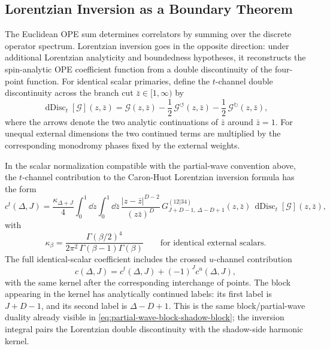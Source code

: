 \subsection{Lorentzian Inversion as a Boundary Theorem}

The Euclidean OPE sum determines correlators by summing over the discrete
operator spectrum.  Lorentzian inversion goes in the opposite direction: under
additional Lorentzian analyticity and boundedness hypotheses, it reconstructs
the spin-analytic OPE coefficient function from a double discontinuity of the
four-point function.  For identical scalar primaries, define the \(t\)-channel
double discontinuity across the branch cut \(\bar z\in[1,\infty)\) by
\begin{equation}
  \operatorname{dDisc}_t[\mathcal G](z,\bar z)
  =
  \mathcal G(z,\bar z)
  -
  \frac12\,\mathcal G^{\circlearrowleft}(z,\bar z)
  -
  \frac12\,\mathcal G^{\circlearrowright}(z,\bar z),
  \label{eq:lorentzian-ddisc-identical}
\end{equation}
where the arrows denote the two analytic continuations of \(\bar z\) around
\(\bar z=1\).  For unequal external dimensions the two continued terms are
multiplied by the corresponding monodromy phases fixed by the external
weights.

In the scalar normalization compatible with the partial-wave convention above,
the \(t\)-channel contribution to the Caron-Huot Lorentzian inversion formula
has the form
\begin{equation}
  c^t(\Delta,J)
  =
  \frac{\kappa_{\Delta+J}}{4}
  \int_0^1\dd z\int_0^1\dd\bar z\,
  \frac{|z-\bar z|^{D-2}}{(z\bar z)^D}\,
  G_{J+D-1,\,\Delta-D+1}^{(12|34)}(z,\bar z)\,
  \operatorname{dDisc}_t[\mathcal G](z,\bar z),
  \label{eq:caron-huot-lorentzian-inversion-identical}
\end{equation}
with
\begin{equation}
  \kappa_\beta
  =
  \frac{\Gamma(\beta/2)^4}
       {2\pi^2\,\Gamma(\beta-1)\Gamma(\beta)}
  \qquad
  \text{for identical external scalars.}
  \label{eq:caron-huot-kappa-identical}
\end{equation}
The full identical-scalar coefficient includes the crossed \(u\)-channel
contribution
\[
  c(\Delta,J)=c^t(\Delta,J)+(-1)^Jc^u(\Delta,J),
\]
with the same kernel after the corresponding interchange of points.  The block
appearing in the kernel has analytically continued labels: its first label is
\(J+D-1\), and its second label is \(\Delta-D+1\).  This is the same
block/partial-wave duality already visible in
\eqref{eq:partial-wave-block-shadow-block}; the inversion integral pairs the
Lorentzian double discontinuity with the shadow-side harmonic kernel.

